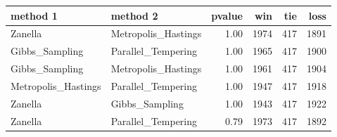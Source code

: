 \begin{table}[ht]
\centering
\begin{tabular}{llrrrr}
  \hline
method 1 & method 2 & pvalue & win & tie & loss \\ 
  \hline
Zanella & Metropolis\_Hastings & 1.00 & 1974 & 417 & 1891 \\ 
  Gibbs\_Sampling & Parallel\_Tempering & 1.00 & 1965 & 417 & 1900 \\ 
  Gibbs\_Sampling & Metropolis\_Hastings & 1.00 & 1961 & 417 & 1904 \\ 
  Metropolis\_Hastings & Parallel\_Tempering & 1.00 & 1947 & 417 & 1918 \\ 
  Zanella & Gibbs\_Sampling & 1.00 & 1943 & 417 & 1922 \\ 
  Zanella & Parallel\_Tempering & 0.79 & 1973 & 417 & 1892 \\ 
   \hline
\end{tabular}
\end{table}
